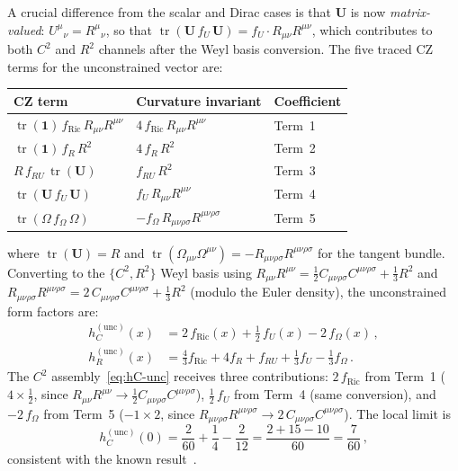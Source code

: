 \documentclass[aps,prd,twocolumn,superscriptaddress,nofootinbib,floatfix]{revtex4-2}
\theoremstyle{definition}
\theoremstyle{remark}
\newcommand{\Weylsq}{C_{\mu\nu\rho\sigma}C^{\mu\nu\rho\sigma}}
\newcommand{\Ricsq}{R_{\mu\nu}R^{\mu\nu}}
\newcommand{\Riemsq}{R_{\mu\nu\rho\sigma}R^{\mu\nu\rho\sigma}}
\newcommand{\tr}{\operatorname{tr}}
\begin{document}
A crucial difference from the scalar and Dirac cases is that $\mathbf{U}$
is now \emph{matrix-valued}: $U^\mu{}_\nu = R^\mu{}_\nu$, so that
$\tr(\mathbf{U}\,f_U\,\mathbf{U}) = f_U \cdot R_{\mu\nu}R^{\mu\nu}$, which
contributes to both $C^2$ and $R^2$ channels after the Weyl basis conversion.
The five traced CZ terms for the unconstrained vector are:
\begin{center}
\renewcommand{\arraystretch}{1.15}
\begin{tabular}{@{}lll@{}}
  \toprule
  CZ term & Curvature invariant & Coefficient \\
  \midrule
  $\tr(\mathbf{1})\,f_{\text{Ric}}\,\Ricsq$ & $4\,f_{\text{Ric}}\,\Ricsq$ &
    Term~1 \\
  $\tr(\mathbf{1})\,f_R\,R^2$ & $4\,f_R\,R^2$ & Term~2 \\
  $R\,f_{RU}\,\tr(\mathbf{U})$ & $f_{RU}\,R^2$ & Term~3 \\
  $\tr(\mathbf{U}\,f_U\,\mathbf{U})$ & $f_U\,\Ricsq$ & Term~4 \\
  $\tr(\Omega\,f_\Omega\,\Omega)$ & $-f_\Omega\,\Riemsq$ & Term~5 \\
  \bottomrule
\end{tabular}
\end{center}
where $\tr(\mathbf{U}) = R$ and $\tr(\Omega_{\mu\nu}\Omega^{\mu\nu}) =
-\Riemsq$ for the tangent bundle. Converting to the $\{C^2, R^2\}$ Weyl
basis using $\Ricsq = \tfrac{1}{2}\Weylsq + \tfrac{1}{3}R^2$ and
$\Riemsq = 2\,\Weylsq + \tfrac{1}{3}R^2$ (modulo the Euler density), the
unconstrained form factors are:
\begin{subequations}
\label{eq:vector-unc}
\begin{align}
  h_C^{(\text{unc})}(x) &= 2\,f_{\text{Ric}}(x) + \tfrac{1}{2}\,f_U(x)
    - 2\,f_\Omega(x)\,,
  \label{eq:hC-unc}\\
  h_R^{(\text{unc})}(x) &= \tfrac{4}{3}f_{\text{Ric}} + 4f_R
    + f_{RU} + \tfrac{1}{3}f_U - \tfrac{1}{3}f_\Omega\,.
  \label{eq:hR-unc}
\end{align}
\end{subequations}
The $C^2$ assembly~\eqref{eq:hC-unc} receives three contributions:
$2\,f_{\text{Ric}}$ from Term~1 ($4 \times \tfrac{1}{2}$, since
$\Ricsq \to \tfrac{1}{2}\Weylsq$), $\tfrac{1}{2}\,f_U$ from Term~4 (same
conversion), and $-2\,f_\Omega$ from Term~5 ($-1 \times 2$, since
$\Riemsq \to 2\,\Weylsq$). The local limit is
\begin{equation}
  h_C^{(\text{unc})}(0) = \frac{2}{60} + \frac{1}{4} - \frac{2}{12}
  = \frac{2 + 15 - 10}{60} = \frac{7}{60}\,,
\end{equation}
consistent with the known result~\cite{Stelle:1976gc,Codello:2008vh}.
\end{document}
